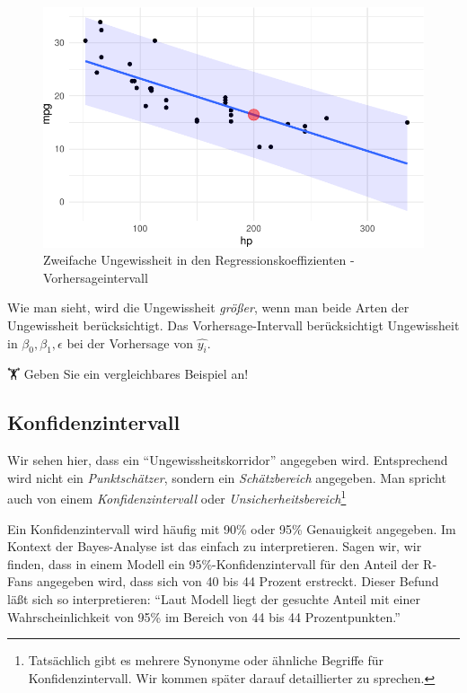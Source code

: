 \documentclass[
  a4paper,
  DIV=11]{scrreprt}
\theoremstyle{definition}
\theoremstyle{remark}
\begin{document}
\begin{figure}

{\centering \includegraphics{./Inferenz_files/figure-pdf/fig-ungewiss2-1.pdf}

}

\caption{\label{fig-ungewiss2}Zweifache Ungewissheit in den
Regressionskoeffizienten - Vorhersageintervall}

\end{figure}

Wie man sieht, wird die Ungewissheit \emph{größer}, wenn man beide Arten
der Ungewissheit berücksichtigt. Das Vorhersage-Intervall berücksichtigt
Ungewissheit in \(\beta_0, \beta_1, \epsilon\) bei der Vorhersage von
\(\hat{y_i}\).

🏋 Geben Sie ein vergleichbares Beispiel an!

\hypertarget{konfidenzintervall}{%
\subsection{Konfidenzintervall}\label{konfidenzintervall}}

Wir sehen hier, dass ein ``Ungewissheitskorridor'' angegeben wird.
Entsprechend wird nicht ein \emph{Punktschätzer}, sondern ein
\emph{Schätzbereich} angegeben. Man spricht auch von einem
\emph{Konfidenzintervall} oder \emph{Unsicherheitsbereich}\footnote{Tatsächlich
  gibt es mehrere Synonyme oder ähnliche Begriffe für
  Konfidenzintervall. Wir kommen später darauf detaillierter zu
  sprechen.}

Ein Konfidenzintervall wird häufig mit 90\% oder 95\% Genauigkeit
angegeben. Im Kontext der Bayes-Analyse ist das einfach zu
interpretieren. Sagen wir, wir finden, dass in einem Modell ein
95\%-Konfidenzintervall für den Anteil der R-Fans angegeben wird, dass
sich von 40 bis 44 Prozent erstreckt. Dieser Befund läßt sich so
interpretieren: ``Laut Modell liegt der gesuchte Anteil mit einer
Wahrscheinlichkeit von 95\% im Bereich von 44 bis 44 Prozentpunkten.''
\end{document}
